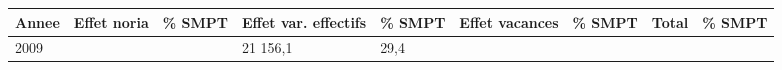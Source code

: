 \begin{longtable}[]{@{}lllllllll@{}}
\toprule
\begin{minipage}[b]{0.05\columnwidth}\raggedright
Annee\strut
\end{minipage} & \begin{minipage}[b]{0.10\columnwidth}\raggedright
Effet noria\strut
\end{minipage} & \begin{minipage}[b]{0.06\columnwidth}\raggedright
\% SMPT\strut
\end{minipage} & \begin{minipage}[b]{0.17\columnwidth}\raggedright
Effet var. effectifs\strut
\end{minipage} & \begin{minipage}[b]{0.06\columnwidth}\raggedright
\% SMPT\strut
\end{minipage} & \begin{minipage}[b]{0.13\columnwidth}\raggedright
Effet vacances\strut
\end{minipage} & \begin{minipage}[b]{0.06\columnwidth}\raggedright
\% SMPT\strut
\end{minipage} & \begin{minipage}[b]{0.05\columnwidth}\raggedright
Total\strut
\end{minipage} & \begin{minipage}[b]{0.06\columnwidth}\raggedright
\% SMPT\strut
\end{minipage}\tabularnewline
\midrule
\endhead
\begin{minipage}[t]{0.05\columnwidth}\raggedright
2009\strut
\end{minipage} & \begin{minipage}[t]{0.10\columnwidth}\raggedright
\strut
\end{minipage} & \begin{minipage}[t]{0.06\columnwidth}\raggedright
\strut
\end{minipage} & \begin{minipage}[t]{0.17\columnwidth}\raggedright
21 156,1\strut
\end{minipage} & \begin{minipage}[t]{0.06\columnwidth}\raggedright
29,4\strut
\end{minipage} & \begin{minipage}[t]{0.13\columnwidth}\raggedright
\strut
\end{minipage} & \begin{minipage}[t]{0.06\columnwidth}\raggedright

\end{minipage}
\end{longtable}
